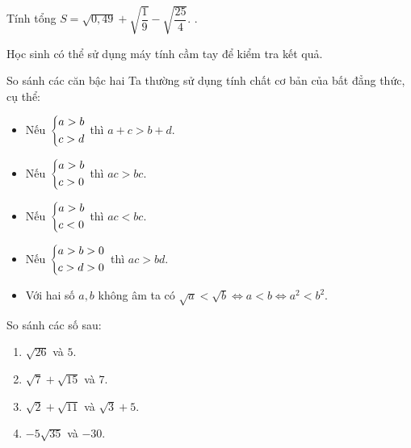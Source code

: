 \begin{vd}
	Tính tổng $S=\sqrt{0{,}49} + \sqrt{\dfrac{1}{9}}-\sqrt{\dfrac{25}{4}}$.
	.
	\begin{note}
		Học sinh có thể sử dụng máy tính cầm tay để kiểm tra kết quả.
	\end{note}
\end{vd}

\begin{dang}{So sánh các căn bậc hai}
	Ta thường sử dụng tính chất cơ bản của bất đẳng thức, cụ thể:
	\begin{itemize}
		\item Nếu $\left\{\begin{aligned}&a>b\\&c >d\end{aligned}\right.$ thì $a+c > b+d$.
		\item Nếu $\left\{\begin{aligned}&a>b\\ &c>0\end{aligned}\right.$ thì $ac >bc$.
		\item Nếu $\left\{\begin{aligned}&a>b\\ &c<0\end{aligned}\right.$ thì $ac <bc$.
		\item Nếu $\left\{\begin{aligned}&a>b>0\\&c >d>0\end{aligned}\right.$ thì $ac > bd$.
		\item Với hai số $a,b$ không âm ta có $\sqrt{a}<\sqrt{b} \Leftrightarrow a<b \Leftrightarrow a^2 < b^2$.
	\end{itemize}
\end{dang}

\begin{vd}
	So sánh các số sau:
	\begin{multicols}{2}
		\begin{enumerate}
			\item $\sqrt{26}$ và $5$.
			\item $\sqrt{7}+\sqrt{15}$ và $7$.
			\item $\sqrt{2}+\sqrt{11}$ và $\sqrt{3}+5$.
			\item $-5\sqrt{35}$ và $-30$.
		\end{enumerate}
	\end{multicols}
\end{vd}

